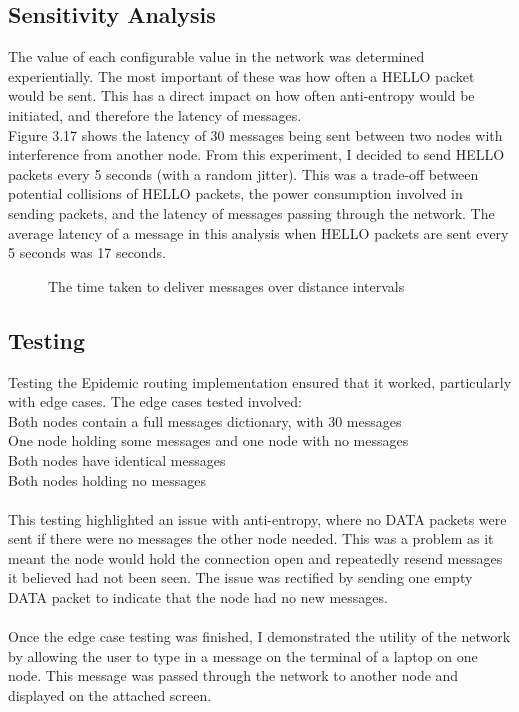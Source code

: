 \documentclass[12pt,a4paper]{report}
\begin{document}
\subsection{Sensitivity Analysis}
The value of each configurable value in the network was determined experientially. The most important of these was how often a HELLO packet would be sent. This has a direct impact on how often anti-entropy would be initiated, and therefore the latency of messages. \\ 
Figure 3.17 shows the latency of 30 messages being sent between two nodes with interference from another node. From this experiment, I decided to send HELLO packets every 5 seconds (with a random jitter). This was a trade-off between potential collisions of HELLO packets, the power consumption involved in sending packets, and the latency of messages passing through the network. The average latency of a message in this analysis when HELLO packets are sent every 5 seconds was 17 seconds. 
\begin{figure}[h]
\begin{center}

\end{center}
\caption{The time taken to deliver messages over distance intervals}
\end{figure}
\FloatBarrier

\subsection{Testing}
Testing the Epidemic routing implementation ensured that it worked, particularly with edge cases. The edge cases tested involved: \\
Both nodes contain a full messages dictionary, with 30 messages \\
One node holding some messages and one node with no messages \\
Both nodes have identical messages \\
Both nodes holding no messages \\ \\
This testing highlighted an issue with anti-entropy, where no DATA packets were sent if there were no messages the other node needed. This was a problem as it meant the node would hold the connection open and repeatedly resend messages it believed had not been seen. The issue was rectified by sending one empty DATA packet to indicate that the node had no new messages. \\ \\
Once the edge case testing was finished, I demonstrated the utility of the network by allowing the user to type in a message on the terminal of a laptop on one node. This message was passed through the network to another node and displayed on the attached screen.
\end{document}
